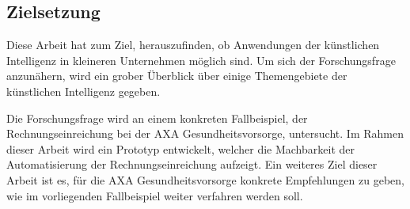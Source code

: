 




\subsection{Zielsetzung}

Diese Arbeit hat zum Ziel, herauszufinden, ob Anwendungen der künstlichen Intelligenz in kleineren Unternehmen möglich sind. Um sich der Forschungsfrage anzunähern, wird ein grober Überblick über einige Themengebiete der künstlichen Intelligenz gegeben. 

Die Forschungsfrage wird an einem konkreten Fallbeispiel, der Rechnungseinreichung bei der AXA Gesundheitsvorsorge, untersucht. Im Rahmen dieser Arbeit wird ein Prototyp entwickelt, welcher die Machbarkeit der Automatisierung der Rechnungseinreichung aufzeigt. Ein weiteres Ziel dieser Arbeit ist es, für die AXA Gesundheitsvorsorge konkrete Empfehlungen zu geben, wie im vorliegenden Fallbeispiel weiter verfahren werden soll.



